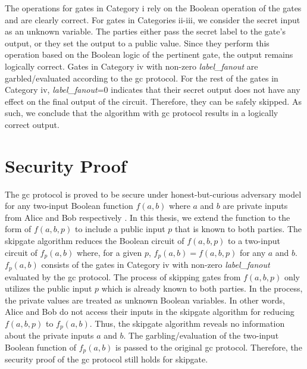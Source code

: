The operations for gates in Category i rely on the Boolean operation of the gates and are clearly correct.
For gates in Categories ii-iii, we consider the secret input as an unknown variable.
The parties either pass the secret label to the gate's output, or they set the output to a public value.
Since they perform this operation based on the Boolean logic of the pertinent gate, the output remains logically correct.
Gates in Category iv with non-zero \textit{label\_fanout} are garbled/evaluated according to the \acrshort{gc} protocol.
For the rest of the gates in Category iv, \textit{label\_fanout}=0 indicates that their secret output does not have any effect on the final output of the circuit.
Therefore, they can be safely skipped.
As such, we conclude that the algorithm with \acrshort{gc} protocol results in a logically correct output.

\section{Security Proof}\label{sec:skipgate-security}
The \acrshort{gc} protocol is proved to be secure under honest-but-curious adversary model for any two-input Boolean function $f(a, b)$ where $a$ and $b$ are private inputs from Alice and Bob respectively \cite{lindell2009proof, bellare2013efficient}.
In this thesis, we extend the function to the form of $f(a, b, p)$ to include a public input $p$ that is known to both parties.
The \gls{skipgate} algorithm reduces the Boolean circuit of $f(a, b, p)$ to a two-input circuit of $f_p(a, b)$ where, for a given $p$, $f_p(a, b) = f(a, b, p)$ for any $a$ and $b$.
$f_p(a, b)$ consists of the gates in Category iv with non-zero \textit{label\_fanout} evaluated by the \acrshort{gc} protocol.
The process of skipping gates from $f(a, b, p)$ only utilizes the public input $p$ which is already known to both parties.
In the process, the private values are treated as unknown Boolean variables.
In other words, Alice and Bob do not access their inputs in the \gls{skipgate} algorithm for reducing $f(a,b,p)$ to $f_p(a, b)$.
Thus, the \gls{skipgate} algorithm reveals no information about the private inputs $a$ and $b$.
The garbling/evaluation of the two-input Boolean function of $f_p(a,b)$ is passed to the original \acrshort{gc} protocol.
Therefore, the security proof of the \acrshort{gc} protocol still holds for \gls{skipgate}.
